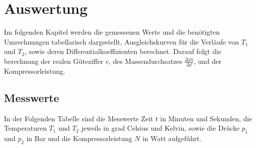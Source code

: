 \section{Auswertung}
\noindent Im folgenden Kapitel werden die gemessenen Werte und die benötigten Umrechnungen tabellarisch dargestellt,
Ausgleichskurven für die Verläufe von $T_1$ und $T_2$, sowie deren Differentialkoeffizienten berechnet. Darauf 
folgt die berechnung der realen Güteziffer $v$, des Massendurchsatzes $\frac{\increment m}{\increment t}$, und der 
Kompressorleistung. 

\subsection{Messwerte}
\noindent In der Folgenden Tabelle sind die Messwerte Zeit $t$ in Minuten und Sekunden, die Temperaturen 
$T_1$ und $T_2$ jeweils in grad Celsius und Kelvin, sowie die Drücke $p_1$ und $p_2$ in Bar und die 
Kompressorleistung $N$ in Watt aufgeführt.

